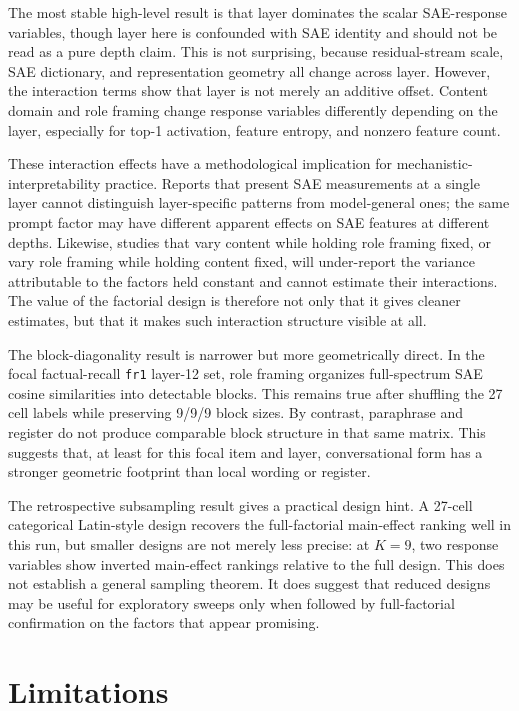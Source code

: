 \documentclass[11pt]{article}
\begin{document}
The most stable high-level result is that layer dominates the scalar SAE-response variables, though layer here is confounded with SAE identity and should not be read as a pure depth claim. This is not surprising, because residual-stream scale, SAE dictionary, and representation geometry all change across layer. However, the interaction terms show that layer is not merely an additive offset. Content domain and role framing change response variables differently depending on the layer, especially for top-1 activation, feature entropy, and nonzero feature count.

These interaction effects have a methodological implication for mechanistic-interpretability practice. Reports that present SAE measurements at a single layer cannot distinguish layer-specific patterns from model-general ones; the same prompt factor may have different apparent effects on SAE features at different depths. Likewise, studies that vary content while holding role framing fixed, or vary role framing while holding content fixed, will under-report the variance attributable to the factors held constant and cannot estimate their interactions. The value of the factorial design is therefore not only that it gives cleaner estimates, but that it makes such interaction structure visible at all.

The block-diagonality result is narrower but more geometrically direct. In the focal factual-recall \texttt{fr1} layer-12 set, role framing organizes full-spectrum SAE cosine similarities into detectable blocks. This remains true after shuffling the 27 cell labels while preserving 9/9/9 block sizes. By contrast, paraphrase and register do not produce comparable block structure in that same matrix. This suggests that, at least for this focal item and layer, conversational form has a stronger geometric footprint than local wording or register.

The retrospective subsampling result gives a practical design hint. A 27-cell categorical Latin-style design recovers the full-factorial main-effect ranking well in this run, but smaller designs are not merely less precise: at $K=9$, two response variables show inverted main-effect rankings relative to the full design. This does not establish a general sampling theorem. It does suggest that reduced designs may be useful for exploratory sweeps only when followed by full-factorial confirmation on the factors that appear promising.

\section{Limitations}
\end{document}
